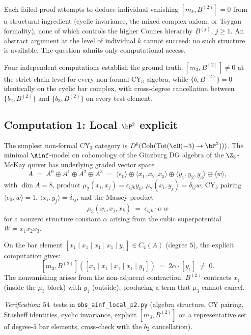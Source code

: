 Each failed proof attempts to deduce individual vanishing
$[m_k, B^{(2)}] = 0$ from a structural ingredient (cyclic
invariance, the mixed complex axiom, or Tsygan formality),
none of which controls the higher Connes hierarchy
$B^{(j)}$, $j \geq 1$.  An abstract argument at the level of
individual $k$ cannot succeed: no such structure is available.
The question admits only computational access.

Four independent computations establish the ground truth:
$[m_3, B^{(2)}] \neq 0$ at the strict chain level for every
non-formal CY$_3$ algebra, while $\{b, B^{(2)}\} = 0$
identically on the cyclic bar complex, with cross-degree
cancellation between $\{b_2, B^{(2)}\}$ and $\{b_3, B^{(2)}\}$
on every test element.


\subsection{Computation 1: Local $\bP^2$ explicit}
\label{subsec:comp-local-p2}

\begin{computation}
\label{comp:local-p2-m3b2}
The simplest non-formal CY$_3$ category is
$D^b(\mathrm{Coh}(\mathrm{Tot}(\cO(-3) \to \bP^2)))$.
The minimal $\Ainf$-model on cohomology of the Ginzburg DG algebra
of the $\Z_3$-McKay quiver has underlying graded vector space
\[
 A \;=\; A^0 \oplus A^1 \oplus A^2 \oplus A^3
 \;=\; \langle e_0 \rangle \oplus \langle x_1, x_2, x_3 \rangle
 \oplus \langle y_1, y_2, y_3 \rangle \oplus \langle w \rangle,
\]
with $\dim A = 8$, product
$\mu_2(x_i, x_j) = \epsilon_{ijk} y_k$,
$\mu_2(x_i, y_j) = \delta_{ij} w$, CY$_3$ pairing
$\langle e_0, w \rangle = 1$,
$\langle x_i, y_j \rangle = \delta_{ij}$, and the
Massey product
\[
 \mu_3(x_i, x_j, x_k) \;=\; \epsilon_{ijk} \cdot \alpha \, w
\]
for a nonzero structure constant $\alpha$ arising from the cubic
superpotential $W = x_1 x_2 x_3$.

On the bar element $[x_1 \mid x_1 \mid x_1 \mid x_1 \mid y_1]
\in C_4(A)$ \textup{(}degree $5$\textup{)}, the explicit
computation gives:
\[
 [m_3, B^{(2)}]([x_1 \mid x_1 \mid x_1 \mid x_1 \mid y_1])
 \;=\; 2\alpha \cdot [y_1] \;\neq\; 0.
\]
The nonvanishing arises from the non-adjacent contraction:
$B^{(2)}$ contracts $x_1$ (inside the $\mu_3$-block) with $y_1$
(outside), producing a term that $\mu_3$ cannot cancel.

\noindent\textit{Verification}: $54$~tests in
\texttt{obs\_ainf\_local\_p2.py} (algebra structure, CY pairing,
Stasheff identities, cyclic invariance, explicit $[m_3, B^{(2)}]$
on a representative set of degree-$5$ bar elements, cross-check
with the $b_2$ cancellation).
\end{computation}

